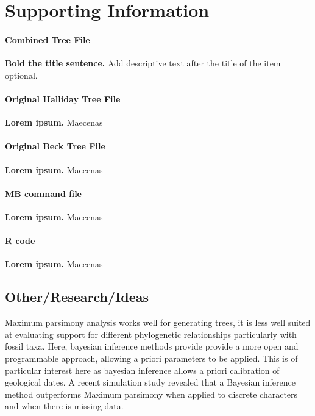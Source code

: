 \documentclass[11pt,letterpaper]{article}
\begin{document}
\nolinenumbers

\section*{Supporting Information}

\paragraph*{Combined Tree File}
\label{S1_Fig}
{\bf Bold the title sentence.} Add descriptive text after the title of the item optional.

\paragraph*{Original Halliday Tree File}
\label{S2_Fig}
{\bf Lorem ipsum.} Maecenas 

\paragraph*{Original Beck Tree File}
\label{S1_File}
{\bf Lorem ipsum.}  Maecenas 
\paragraph*{MB command file}
\label{S1_Video}
{\bf Lorem ipsum.}  Maecenas 

\paragraph*{R code}
\label{S1_Appendix}
{\bf Lorem ipsum.} Maecenas 



\subsection{Other/Research/Ideas}


Maximum parsimony analysis works well for generating trees, it is less well suited at evaluating support for different phylogenetic relationships particularly with fossil taxa. Here, bayesian inference methods provide provide a more open and programmable approach, allowing a priori parameters to be applied. This is of particular interest here as bayesian inference allows a priori calibration of geological dates. A recent simulation study revealed that a Bayesian inference method outperforms Maximum parsimony when applied to discrete characters and when there is missing data.
\end{document}
